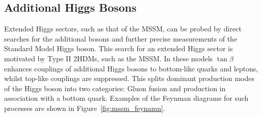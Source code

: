 \subsection{Additional Higgs Bosons} 
\label{sec:additional_higgs_bosons} 
 
Extended Higgs sectors, such as that of the MSSM, can be probed by direct searches for the additional bosons and further precise measurements of the Standard Model Higgs boson. 
This search for an extended Higgs sector is motivated by Type II 2HDMs, such as the MSSM.
In these models $\tan\beta$ enhances couplings of additional Higgs bosons to bottom-like quarks and leptons, whilst top-like couplings are suppressed.
This splits dominant production modes of the Higgs boson into two categories: Gluon fusion and production in association with a bottom quark.
Examples of the Feynman diagrams for such processes are shown in Figure~\ref{fig:mssm_feynamn}.

